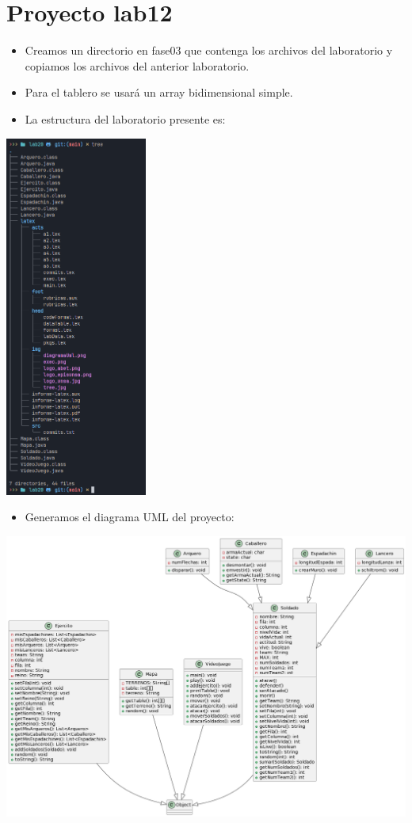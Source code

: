\newpage %
\section{Proyecto lab12}
\begin{itemize}
  \item Creamos un directorio en fase03 que contenga los archivos del laboratorio y copiamos los archivos del anterior laboratorio.
  \item Para el tablero se usará un array bidimensional simple.
  \item La estructura del laboratorio presente es:
\end{itemize}
\includegraphics[width=0.35\textwidth]{img/tree.jpg}

\begin{itemize}
  \item Generamos el diagrama UML del proyecto:
\end{itemize}
\includegraphics[width=1\textwidth]{img/diagramaUML.jpg}
